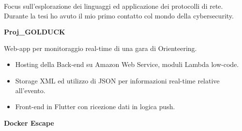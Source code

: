 \documentclass[a4paper]{letter}
\begin{document}
\begin{minipage}[t]{0.30\textwidth}
\setlength{\baselineskip}{1.5\baselineskip}
\color{white}


\end{minipage}
\hfill
\begin{minipage}[t]{0.65\textwidth}
\setlength{\baselineskip}{1.4\baselineskip}

\vspace{2 mm}

\makeatletter
\newcommand{\ProgettiTriennaleBox}{%
}
\makeatother

\ProgettiTriennaleBox

\vspace{0.8 cm}

Focus sull'esplorazione dei linguaggi ed applicazione dei protocolli di rete. Durante la tesi ho avuto il mio primo contatto col mondo della cybersecurity.

\vspace{2 mm}
{\large \textbf{Proj\_GOLDUCK}}

{\small Web-app per monitoraggio real-time di una gara di Orienteering. }

\begin{itemize}
    \item Hosting della Back-end su Amazon Web Service, moduli Lambda low-code.
    \item Storage XML ed utilizzo di JSON per informazioni real-time relative all'evento.
    \item Front-end in Flutter con ricezione dati in logica push.
\end{itemize}
\vspace{1 mm}

{\large \textbf{Docker Escape}}


\end{minipage}
\end{document}
